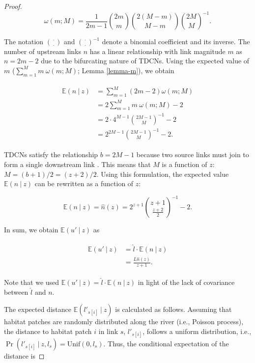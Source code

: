 \documentclass[11pt, class=article, crop=false]{standalone}
\theoremstyle{definition}
\begin{document}
\begin{proof}
\begin{equation}
    \omega(m; M) = \frac{1}{2m - 1} \binom{2m}{m} \binom{2(M - m)}{M - m} \binom{2M}{M}^{-1}.
\end{equation}

The notation $\binom{\cdot}{\cdot}$ and $\binom{\cdot}{\cdot}^{-1}$ denote a binomial coefficient and its inverse.
The number of upstream links $n$ has a linear relationship with link magnitude $m$ as $n = 2m - 2$ due to the bifurcating nature of TDCNs.
Using the expected value of $m$ ($\sum_{m=1}^{M} m~\omega(m; M)$; Lemma \ref{lemma-m}), we obtain

\begin{align}
    \begin{split}
    \mathbb{E}(n~|~z) 
        &= \sum_{m=1}^{M} (2m - 2) \omega(m; M)\\
        &= 2 \sum_{m=1}^{M} m~\omega(m; M) - 2\\
        &= 2 \cdot 4^{M-1} \binom{2M-1}{M}^{-1} - 2\\
        &= 2^{2M-1} \binom{2M-1}{M}^{-1} - 2.
    \end{split}
    \label{eq:n-hat}
\end{align}

TDCNs satisfy the relationship $b = 2M - 1$ because two source links must join to form a single downstream link \citep{shreve_infinite_1967, rodriguez-iturbe_fractal_2001}.
This means that $M$ is a function of $z$: $M = (b + 1) / 2 = (z + 2) / 2$.
Using this formulation, the expected value $\mathbb{E}(n~|~z)$ can be rewritten as a function of $z$:

\begin{equation}
    \mathbb{E}(n~|~z) = \hat{n}(z) = 
    2^{z + 1} \binom{z + 1}{\frac{z + 2}{2}}^{-1} - 2.
\end{equation}

In sum, we obtain $\mathbb{E}(u' ~|~ z)$ as

\begin{align}
    \begin{split}
        \mathbb{E}(u' ~|~ z) 
        &= \hat{l} \cdot \mathbb{E}(n ~|~ z)\\
        &= \frac{L \hat{n}(z)}{z + 1}.
    \end{split}
\end{align}

Note that we used $\mathbb{E}(u' ~|~ z)  = \hat{l} \cdot \mathbb{E}(n ~|~ z)$ in light of the lack of covariance between $\hat{l}$ and $n$.

The expected distance $\mathbb{E}(l'_{s[i]}~|~z)$ is calculated as follows.
Assuming that habitat patches are randomly distributed along the river (i.e., Poisson process), the distance to habitat patch $i$ in link $s$, $l'_{s[i]}$, follows a uniform distribution, i.e.,  $\Pr(l'_{s[i]}~|~z, l_s) = \mbox{Unif}(0, l_s)$.
Thus, the conditional expectation of the distance is


\end{proof}
\end{document}
